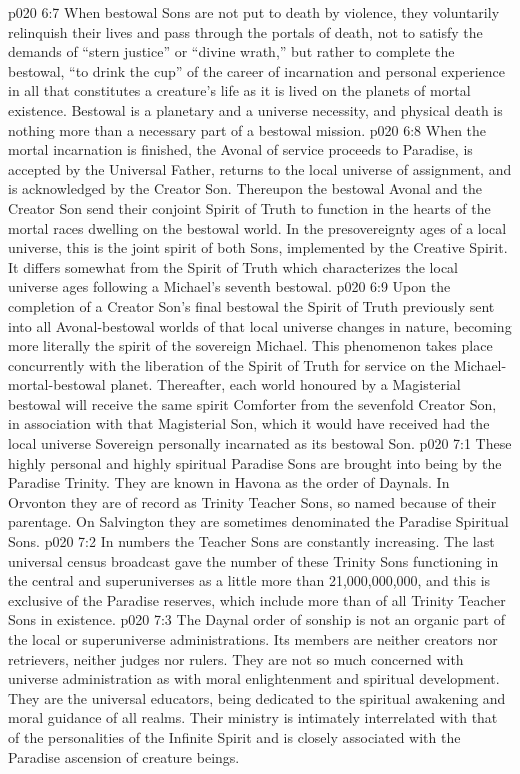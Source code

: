 \vs p020 6:7 When bestowal Sons are not put to death by violence, they voluntarily relinquish their lives and pass through the portals of death, not to satisfy the demands of “stern justice” or “divine wrath,” but rather to complete the bestowal, “to drink the cup” of the career of incarnation and personal experience in all that constitutes a creature’s life as it is lived on the planets of mortal existence. Bestowal is a planetary and a universe necessity, and physical death is nothing more than a necessary part of a bestowal mission.
\vs p020 6:8 When the mortal incarnation is finished, the Avonal of service proceeds to Paradise, is accepted by the Universal Father, returns to the local universe of assignment, and is acknowledged by the Creator Son. Thereupon the bestowal Avonal and the Creator Son send their conjoint Spirit of Truth to function in the hearts of the mortal races dwelling on the bestowal world. In the presovereignty ages of a local universe, this is the joint spirit of both Sons, implemented by the Creative Spirit. It differs somewhat from the Spirit of Truth which characterizes the local universe ages following a Michael’s seventh bestowal.
\vs p020 6:9 Upon the completion of a Creator Son’s final bestowal the Spirit of Truth previously sent into all Avonal\hyp{}bestowal worlds of that local universe changes in nature, becoming more literally the spirit of the sovereign Michael. This phenomenon takes place concurrently with the liberation of the Spirit of Truth for service on the Michael\hyp{}mortal\hyp{}bestowal planet. Thereafter, each world honoured by a Magisterial bestowal will receive the same spirit Comforter from the sevenfold Creator Son, in association with that Magisterial Son, which it would have received had the local universe Sovereign personally incarnated as its bestowal Son.
\vs p020 7:1 These highly personal and highly spiritual Paradise Sons are brought into being by the Paradise Trinity. They are known in Havona as the order of Daynals. In Orvonton they are of record as Trinity Teacher Sons, so named because of their parentage. On Salvington they are sometimes denominated the Paradise Spiritual Sons.
\vs p020 7:2 In numbers the Teacher Sons are constantly increasing. The last universal census broadcast gave the number of these Trinity Sons functioning in the central and superuniverses as a little more than 21,000,000,000, and this is exclusive of the Paradise reserves, which include more than  of all Trinity Teacher Sons in existence.
\vs p020 7:3 The Daynal order of sonship is not an organic part of the local or superuniverse administrations. Its members are neither creators nor retrievers, neither judges nor rulers. They are not so much concerned with universe administration as with moral enlightenment and spiritual development. They are the universal educators, being dedicated to the spiritual awakening and moral guidance of all realms. Their ministry is intimately interrelated with that of the personalities of the Infinite Spirit and is closely associated with the Paradise ascension of creature beings.
